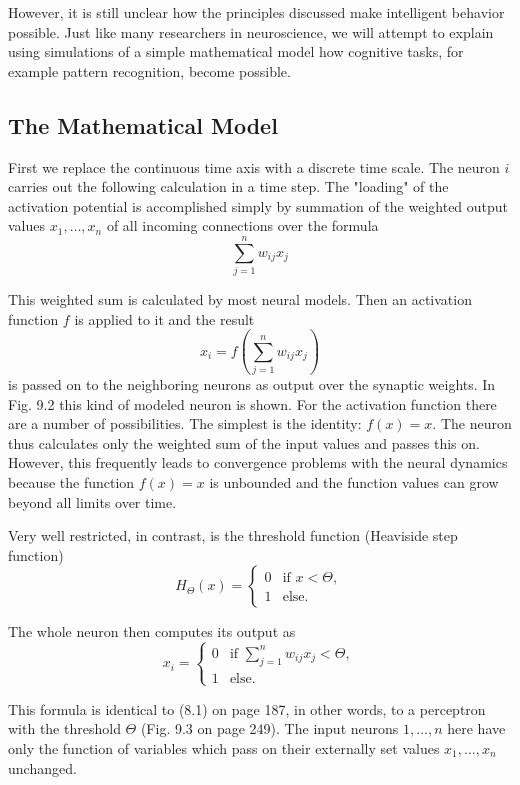 \documentclass[10pt]{book}
\begin{document}
However, it is still unclear how the principles discussed make intelligent behavior possible. Just like many researchers in neuroscience, we will attempt to explain using simulations of a simple mathematical model how cognitive tasks, for example pattern recognition, become possible.

\subsection{The Mathematical Model}
First we replace the continuous time axis with a discrete time scale. The neuron $i$ carries out the following calculation in a time step. The "loading" of the activation potential is accomplished simply by summation of the weighted output values $x_{1}, \ldots, x_{n}$ of all incoming connections over the formula
\[
\sum_{j=1}^{n} w_{i j} x_{j}
\]

This weighted sum is calculated by most neural models. Then an activation function $f$ is applied to it and the result
\[
x_{i}=f\left(\sum_{j=1}^{n} w_{i j} x_{j}\right)
\]
is passed on to the neighboring neurons as output over the synaptic weights. In Fig. 9.2 this kind of modeled neuron is shown. For the activation function there are a number of possibilities. The simplest is the identity: $f(x)=x$. The neuron thus calculates only the weighted sum of the input values and passes this on. However, this frequently leads to convergence problems with the neural dynamics because the function $f(x)=x$ is unbounded and the function values can grow beyond all limits over time.

Very well restricted, in contrast, is the threshold function (Heaviside step function)
\[
H_{\Theta}(x)=
\begin{cases}
0 & \text{if } x<\Theta,\\
1 & \text{else.}
\end{cases}
\]

The whole neuron then computes its output as
\[
x_{i}=
\begin{cases}
0 & \text{if } \sum_{j=1}^{n} w_{i j} x_{j}<\Theta,\\
1 & \text{else.}
\end{cases}
\]

This formula is identical to (8.1) on page 187, in other words, to a perceptron with the threshold $\Theta$ (Fig. 9.3 on page 249). The input neurons $1, \ldots, n$ here have only the function of variables which pass on their externally set values $x_{1}, \ldots, x_{n}$ unchanged.
\end{document}
